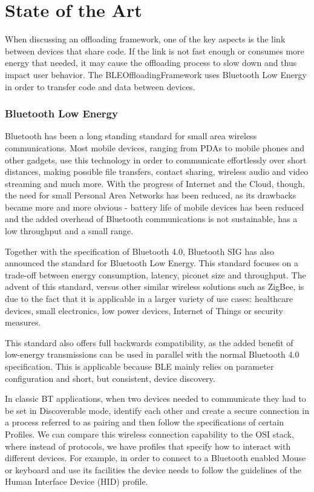 \chapter{State of the Art}
\label{chapter:stateoftheart}

When discussing an offloading framework, one of the key aspects is the link between devices that share code. If the link is not fast enough or consumes more energy that needed, it may cause the offloading process to slow down and thus impact user behavior. The BLEOffloadingFramework uses Bluetooth Low Energy in order to transfer code and data between devices.

\subsection{Bluetooth Low Energy}
\label{ble}

Bluetooth has been a long standing standard for small area wireless communications. Most mobile devices, ranging from PDAs to mobile phones and other gadgets, use this technology in order to communicate effortlessly over short distances, making possible file transfers, contact sharing, wireless audio and video streaming and much more. With the progress of Internet and the Cloud, though, the need for small Personal Area Networks has been reduced, as its drawbacks became more and more obvious - battery life of mobile devices has been reduced and the added overhead of Bluetooth communications is not sustainable, has a low throughput and a small range. 

Together with the specification of Bluetooth 4.0, Bluetooth SIG has also announced the standard for Bluetooth Low Energy. This standard focuses on a trade-off between energy consumption, latency, piconet size and throughput. The advent of this standard, versus other similar wireless solutions such as ZigBee, is due to the fact that it is applicable in a larger variety of use cases: healthcare devices, small electronics, low power devices, Internet of Things
or security measures.

This standard also offers full backwards compatibility, as the added benefit of low-energy transmissions can be used in parallel with the normal Bluetooth 4.0 specification. This is applicable because BLE mainly relies on parameter configuration and short, but consistent, device discovery.

In classic BT applications, when two devices needed to communicate they had to be set in Discoverable mode, identify each other and create a secure connection in a process referred to as pairing and then follow the specifications of certain Profiles. We can compare this wireless connection capability to the OSI stack, where instead of protocols, we have profiles that specify how to interact with different devices. For example, in order to connect to a Bluetooth enabled
Mouse or keyboard and use its facilities the device needs to follow the guidelines of the Human Interface Device (HID) profile.

